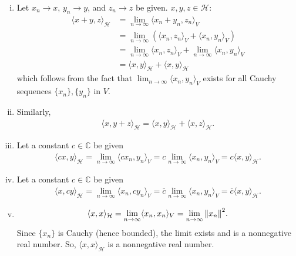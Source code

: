 \documentclass[11pt]{article}
\begin{document}
\begin{enumerate}[(a)]
\begin{itemize}
\begin{enumerate}[(i)]
			\item Let $x_n \to x$, $y_n \to y$, and $z_n \to z$ be given. $x,y,z\in \mathcal{H}$:
			\begin{align*}
			\langle x+y,z \rangle_\mathcal{H} &= \lim_{n\to\infty}\langle x_n+y_n,z_n \rangle_V \\
			&= \lim_{n\to\infty}\left(\langle x_n,z_n \rangle_V + \langle x_n,y_n\rangle_V\right) \\
			&= \lim_{n\to\infty}\langle x_n,z_n \rangle_V + \lim_{n\to\infty}\langle x_n,y_n\rangle_V\\
			&= \langle x,y \rangle_\mathcal{H} + \langle x,y\rangle_\mathcal{H} 
			\end{align*}
			which follows from the fact that $\lim_{n\to\infty}\langle x_n,y_n \rangle_V$ exists for all Cauchy sequences $\{x_n\}, \{y_n\}$ in $V$.
			
			\item Similarly,
			\begin{align*}
			\langle x,y+z\rangle_\mathcal{H} = \langle x,y\rangle_\mathcal{H} + \langle x,z\rangle_\mathcal{H}.
			\end{align*}
			
			\item Let a constant $c\in \mathbb{C}$ be given
			\begin{align*}
			\langle cx,y\rangle_\mathcal{H} = \lim_{n\to\infty}\langle cx_n,y_n\rangle_V = c \lim_{n\to\infty}\langle x_n,y_n\rangle_V = c\langle x,y\rangle_\mathcal{H}.
			\end{align*}

			
			
			\item Let a constant $c\in \mathbb{C}$ be given
			\begin{align*}
			\langle x,cy\rangle_\mathcal{H} = \lim_{n\to\infty}\langle x_n,cy_n\rangle_V = \overline{c} \lim_{n\to\infty}\langle x_n,y_n\rangle_V = \overline{c}\langle x,y\rangle_\mathcal{H}.
			\end{align*}
			
			
			\item 
			\begin{align*}
			\langle x,x\rangle_\mathcal{H} = \lim_{n\to \infty}\langle x_n,x_n\rangle_V = \lim_{n\to\infty}\norm{x_n}^2.
			\end{align*}
			Since $\{x_n\}$ is Cauchy (hence bounded), the limit exists and is a nonnegative real number. So, $\langle x,x\rangle_\mathcal{H}$ is a nonnegative real number. 
			

\end{enumerate}
\end{itemize}
\end{enumerate}
\end{document}

